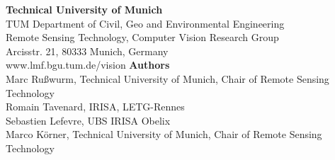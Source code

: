 \documentclass[a0]{tumposter}
\begin{document}
\begin{footer}
	\begin{multicols}{2}
		\textbf{Technical University of Munich}\\
		TUM Department of Civil, Geo and Environmental Engineering \\
		Remote Sensing Technology, Computer Vision Research Group \\
		Arcisstr. 21, 80333 Munich, Germany \\
		www.lmf.bgu.tum.de/vision
	\vfill\columnbreak
		\textbf{Authors} \\
		Marc Rußwurm, Technical University of Munich, Chair of Remote Sensing Technology \\
		Romain Tavenard, IRISA, LETG-Rennes \\
		Sebastien Lefevre, UBS IRISA Obelix  \\
		Marco Körner, Technical University of Munich, Chair of Remote Sensing Technology
	\vfill
	\end{multicols}
\end{footer}
\end{document}
